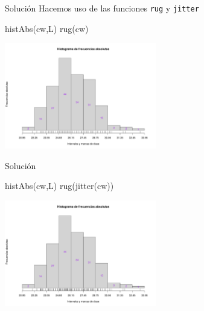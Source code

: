 \documentclass[
  ignorenonframetext,
  aspectratio=169]{beamer}
\newenvironment{Shaded}{\begin{snugshade}}{\end{snugshade}}
\newcommand{\FunctionTok}[1]{\textcolor[rgb]{0.00,0.00,0.00}{#1}}
\newcommand{\NormalTok}[1]{#1}
\begin{document}
\begin{frame}[fragile]{Solución}
\protect\hypertarget{soluciuxf3n-42}{}
Hacemos uso de las funciones \texttt{rug} y \texttt{jitter}

\begin{Shaded}
\begin{Highlighting}[]
\FunctionTok{histAbs}\NormalTok{(cw,L)}
\FunctionTok{rug}\NormalTok{(cw)}
\end{Highlighting}
\end{Shaded}

\begin{center}\includegraphics[width=250px]{Hora6_files/figure-beamer/unnamed-chunk-60-1} \end{center}
\end{frame}

\begin{frame}[fragile]{Solución}
\protect\hypertarget{soluciuxf3n-43}{}
\begin{Shaded}
\begin{Highlighting}[]
\FunctionTok{histAbs}\NormalTok{(cw,L)}
\FunctionTok{rug}\NormalTok{(}\FunctionTok{jitter}\NormalTok{(cw))}
\end{Highlighting}
\end{Shaded}

\begin{center}\includegraphics[width=250px]{Hora6_files/figure-beamer/unnamed-chunk-61-1} \end{center}
\end{frame}
\end{document}
